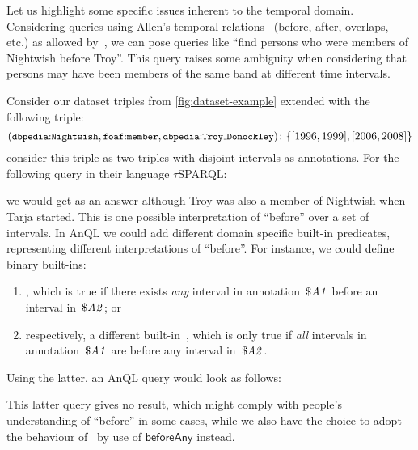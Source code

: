 Let us highlight some specific issues inherent to the temporal domain.  Considering queries using Allen's temporal
relations~\cite{Allen:1983aa} (before, after, overlaps, etc.) as allowed by~\citet{TappoletBernstein:2009aa}, we can
pose queries like ``find persons who were members of Nightwish before Troy''.  This query raises some ambiguity when
considering that persons may have been members of the same band at different time intervals.
% 
\begin{example}
  Consider our dataset triples from \cref{fig:dataset-example} extended with the following triple:
  \[
  \fuzzyg{\triple{\qname{dbpedia}{Nightwish},\qname{foaf}{member},\qname{dbpedia}{Troy\mathunderscore{}Donockley}}}{\{[1996,1999],[2006,2008]\}}
  \]
  \citet{TappoletBernstein:2009aa} consider this triple as two triples with disjoint intervals as annotations. For the
  following query in their language $\tau$SPARQL:
  
  we would get  as an answer although Troy was also a member of Nightwish
  when Tarja started.  This is one possible interpretation of ``before'' over a set of intervals.
  In AnQL we could add different domain specific built-in predicates, representing different interpretations of
  ``before''.
  For instance, we could define binary built-ins:
  \begin{enumerate}[noitemsep,label=(\roman*)]
  \item {}, which is true if there exists \emph{any} interval in
    annotation~$\$\mathit{A1}$ before an interval in~$\$\mathit{A2}$; or
  \item respectively, a different built-in~, which is only true if
    \emph{all} intervals in annotation~$\$\mathit{A1}$ are before any interval in~$\$\mathit{A2}$.
  \end{enumerate}
  Using the latter, an AnQL query would look as follows:
  
  This latter query gives no result, which might comply with people's understanding of ``before'' in some cases, while
  we also have the choice to adopt the behaviour of~\citet{TappoletBernstein:2009aa} by use of $\mathsf{beforeAny}$
  instead.
\end{example}


